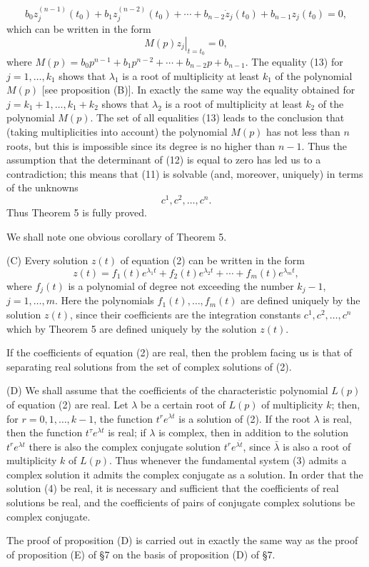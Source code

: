\documentclass[10pt,a5paper]{book}
\makeatletter
\theoremstyle{plain}
\theoremstyle{definition}
\theoremstyle{remark}
\renewenvironment{proof}[1][\proofname]{\par
  \pushQED{\qed}%
  \normalfont\topsep6\p@\@plus6\p@\relax
  \trivlist
  \item\relax{\itshape #1\@addpunct{.}}\hspace\labelsep\ignorespaces
}{\popQED\endtrivlist\@endpefalse}
\makeatother
\begin{document}
\begin{proof}[Proof of Theorem 5]
\[
b_{0} z_{j}^{(n-1)}\left(t_{0}\right)+b_{1} z_{j}^{(n-2)}\left(t_{0}\right)+\cdots+b_{n-2} \dot{z}_{j}\left(t_{0}\right)+b_{n-1} z_{j}\left(t_{0}\right)=0,
\]
which can be written in the form
\begin{equation*}
\left.M(p) z_{j}\right|_{t=t_{0}}=0, \tag{13}
\end{equation*}
where $M(p)=b_{0} p^{n-1}+b_{1} p^{n-2}+\cdots+b_{n-2} p+b_{n-1}$. The equality (13) for $j=1, \ldots, k_{1}$ shows that $\lambda_{1}$ is a root of multiplicity at least $k_{1}$ of the polynomial $M(p)$ [see proposition (B)]. In exactly the same way the equality obtained for $j=k_{1}+1, \ldots, k_{1}+k_{2}$ shows that $\lambda_{2}$ is a root of multiplicity at least $k_{2}$ of the polynomial $M(p)$. The set of all equalities (13) leads to the conclusion that (taking multiplicities into account) the polynomial $M(p)$ has not less than $n$ roots, but this is impossible since its degree is no higher than $n-1$. Thus the assumption that the determinant of (12) is equal to zero has led us to a contradiction; this means that (11) is solvable (and, moreover, uniquely) in terms of the unknowns
\[
c^{1}, c^{2}, \ldots, c^{n} .
\]
Thus Theorem 5 is fully proved.

We shall note one obvious corollary of Theorem 5.

(C) Every solution $z(t)$ of equation (2) can be written in the form
\[
z(t)=f_{1}(t) e^{\lambda_{1} t}+f_{2}(t) e^{\lambda_{2} t}+\cdots+f_{m}(t) e^{\lambda_{m} t},
\]
where $f_{j}(t)$ is a polynomial of degree not exceeding the number $k_{j}-1$, $j=1, \ldots, m$. Here the polynomials $f_{1}(t), \ldots, f_{m}(t)$ are defined uniquely by the solution $z(t)$, since their coefficients are the integration constants $c^{1}, c^{2}, \ldots, c^{n}$ which by Theorem 5 are defined uniquely by the solution $z(t)$.

If the coefficients of equation (2) are real, then the problem facing us is that of separating real solutions from the set of complex solutions of (2).

(D) We shall assume that the coefficients of the characteristic polynomial $L(p)$ of equation (2) are real. Let $\lambda$ be a certain root of $L(p)$ of multiplicity $k$; then, for $r=0,1, \ldots, k-1$, the function $t^{r} e^{\lambda t}$ is a solution of (2). If the root $\lambda$ is real, then the function $t^{\tau} e^{\lambda t}$ is real; if $\lambda$ is complex, then in addition to the solution $t^{r} e^{\lambda t}$ there is also the complex conjugate solution $t^{r} e^{\overline{\lambda t}}$, since $\bar{\lambda}$ is also a root of multiplicity $k$ of $L(p)$. Thus whenever the fundamental system (3) admits a complex solution it admits the complex conjugate as a solution. In order that the solution (4) be real, it is necessary and sufficient that the coefficients of real solutions be real, and the coefficients of pairs of conjugate complex solutions be complex conjugate.

The proof of proposition (D) is carried out in exactly the same way as the proof of proposition (E) of §7 on the basis of proposition (D) of §7.
\end{proof}
\end{document}
